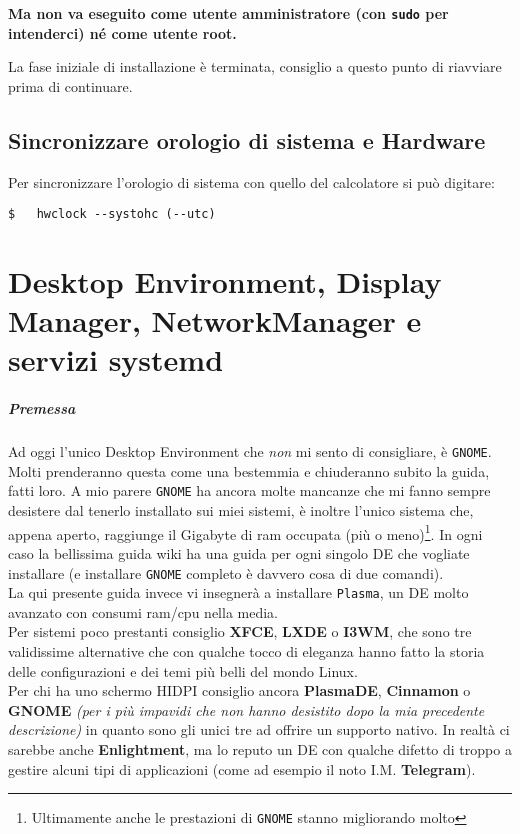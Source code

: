 \documentclass[twoside,italian]{book}
\newcommand{\code}[1]{\texttt{#1}}
\begin{document}
    \begin{center}
        \textbf{Ma non va eseguito come utente amministratore (con \code{sudo} per intenderci) né come utente root.}
    \end{center}
    
    La fase iniziale di installazione è terminata, consiglio a questo punto di riavviare prima di continuare.
    
    
\section{Sincronizzare orologio di sistema e Hardware}
    Per sincronizzare l'orologio di sistema con quello del calcolatore si può digitare:
    \begin{lstlisting}
$   hwclock --systohc (--utc)
    \end{lstlisting}

\chapter{Desktop Environment, Display Manager, NetworkManager e servizi systemd}

\paragraph{Premessa} Ad oggi l'unico Desktop Environment che \emph{non} mi sento di consigliare, è \code{GNOME}. Molti prenderanno questa come una bestemmia e chiuderanno subito la guida, fatti loro. A mio parere \code{GNOME} ha ancora molte mancanze che mi fanno sempre desistere dal tenerlo installato sui miei sistemi, è inoltre l'unico sistema che, appena aperto, raggiunge il Gigabyte di ram occupata (più o meno)\footnote{Ultimamente anche le prestazioni di \code{GNOME} stanno migliorando molto}. In ogni caso la bellissima guida wiki ha una guida per ogni singolo DE che vogliate installare (e installare \code{GNOME} completo è davvero cosa di due comandi).\\
La qui presente guida invece vi insegnerà a installare \code{Plasma}, un \ac{DE} molto avanzato con consumi ram/cpu nella media.\\ Per sistemi poco prestanti consiglio \textbf{XFCE}, \textbf{LXDE} o \textbf{I3WM}, che sono tre validissime alternative che con qualche tocco di eleganza hanno fatto la storia delle configurazioni e dei temi più belli del mondo Linux.\\
Per chi ha uno schermo HIDPI consiglio ancora \textbf{PlasmaDE}, \textbf{Cinnamon} o \textbf{GNOME} \textit{(per i più impavidi che non hanno desistito dopo la mia precedente descrizione)} in quanto sono gli unici tre ad offrire un supporto nativo. In realtà ci sarebbe anche \textbf{Enlightment}, ma lo reputo un DE con qualche difetto di troppo a gestire alcuni tipi di applicazioni (come ad esempio il noto I.M. \textbf{Telegram}).
\end{document}
